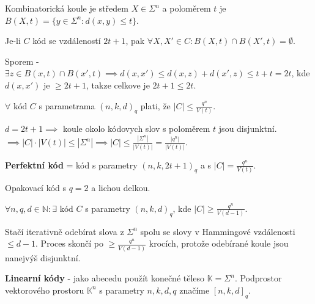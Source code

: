 \begin{definice}
	Kombinatorická koule je středem $X \in \Sigma^n$ a poloměrem $t$ je $B(X,t) = \{y \in \Sigma^n : d(x,y) \leq t\}$.
\end{definice}

\begin{lemma}
	Je-li $C$ kód se vzdáleností $2t+1$, pak $\forall X,X' \in C: B(X,t) \cap B(X',t) = \emptyset$.
\end{lemma}

\begin{dukaz}
	Sporem - $\exists z \in B(x, t) \cap B(x', t) \implies d(x, x') \leq d(x,z) + d(x', z) \leq t+t = 2t$, kde $d(x, x')$ je $\geq 2t+1$, takze celkove je $2t+1 \leq 2t$.
\end{dukaz}

\begin{veta}
	$\forall \text{ kód } C$ s parametrama $(n,k,d)_q$ plati, že $|C| \leq \frac{q^n}{V(t)}$.
\end{veta}

\begin{dukaz}
	$d = 2t +1 \implies$ koule okolo kódovych slov s poloměrem $t$ jsou disjunktní. $\implies |C| \cdot |V(t)| \leq |\Sigma^n| \implies |C| \leq \frac{|\Sigma^n|}{|V(t)|} = \frac{|q^n|}{|V(t)|}$.
\end{dukaz}

\begin{definice}
	\textbf{Perfektní kód} = kód s parametry $(n,k, 2t+1)_q$ a s $|C| = \frac{q^n}{V(t)}$.
\end{definice}


Opakovací kód s $q=2$ a lichou delkou.

\begin{veta}
	$\forall n,q,d \in \mathbb{N}: \exists \text{ kód } C$ s parametry $(n,k,d)_q$, kde $|C| \geq \frac{q^n}{V(d-1)}$.
\end{veta}

\begin{dukaz}
	Stačí iterativně odebírat slova z $\Sigma^n$ spolu se slovy v Hammingové vzdálenosti $\leq d-1$. Proces skončí po $\geq \frac{q^n}{V(d-1)}$ krocích, protože odebírané koule jsou nanejvýš disjunktní.
\end{dukaz}

\begin{definice}
	\textbf{Linearní kódy} - jako abecedu použít konečné těleso $\mathbb{K} = \Sigma^n$. Podprostor vektorového prostoru $\mathbb{K}^n$ s parametry $n,k,d,q$ značíme $[n,k,d]_q$.
\end{definice}

